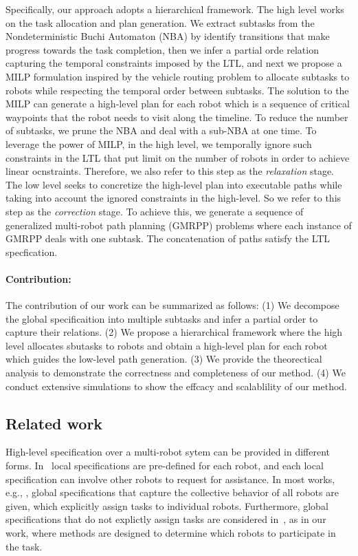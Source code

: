 \documentclass[Afour,sageh,times]{sagej}
\begin{document}
Specifically, our approach adopts a hierarchical framework. The high level works on the task allocation and plan generation. We extract subtasks from the Nondeterministic Buchi Automaton (NBA) by identify transitions that make progress towards the task completion,  then we infer a partial orde relation capturing the temporal constraints imposed by the LTL, and next we propose a MILP formulation inspired by the vehicle routing problem to allocate subtasks to robots while respecting the temporal order  between subtasks. The solution to the MILP can generate a high-level plan for each robot which is a sequence of critical  waypoints that the robot needs to visit along the timeline. To reduce the number of subtasks, we prune the NBA and deal with a sub-NBA at one time.  To leverage the power of MILP, in the high level, we temporally ignore such constraints in the LTL that put limit on the number of robots in order to achieve linear ocnstraints. Therefore, we also refer to this step as the {\it relaxation} stage. The low level seeks to concretize the high-level plan into executable paths while taking into account the ignored constraints in the high-level. So we refer to this step as the {\it correction} stage. To achieve this, we generate a sequence of generalized multi-robot path planning (GMRPP) problems where each instance of GMRPP deals with one subtask. The concatenation of paths satisfy the LTL specfication.

\paragraph{Contribution:} The contribution of our work can be summarized as follows: (1) We decompose the global specificaition into multiple subtasks  and infer a partial order  to capture their relations.  (2) We propose a hierarchical framework where the high level allocates sbutasks to robots and obtain a high-level plan for each robot which guides the low-level path generation. (3) We provide the theorectical analysis to demonstrate the correctness and completeness of our method. (4) We conduct extensive simulations to show the effcacy and scalablility of our method.

\subsection{Related work}
High-level specification over a multi-robot sytem can be provided in different forms. In~\cite{guo2015multi,tumova2016multi} local specifications are pre-defined for each robot, and each local specification  can involve other robots to request for assistance. In most works, e.g., \cite{loizou2004automatic,smith2011optimal,saha2014automated,kantaros2015intermittent,kantaros2017sampling,kantaros2018sampling,kantaros2018text,kantaros2018temporal,kantaros2018distributedOpt,xluo_CDC19,luo2019abstraction}, global specifications that capture the collective behavior of all robots are given, which explicitly assign tasks to individual robots. Furthermore, global specifications that do not explictly assign tasks are considered in~\cite{kloetzer2011multi,shoukry2017linear,moarref2017decentralized,lacerda2019petri}, as in our work, where methods are designed to  determine which robots to participate in the task.
\end{document}
